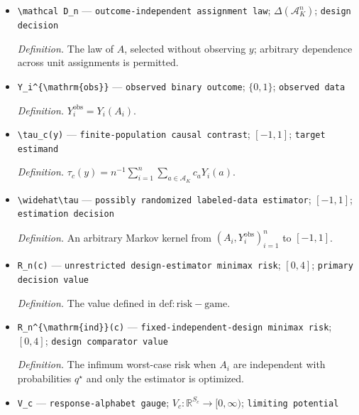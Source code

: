 \documentclass{article}
\begin{document}
\begin{itemize}
  \par\smallskip\noindent\emph{Definition.} \(A=(A_1,\ldots,A_n)\) is the sole source of randomness in the experiment.
  \item \texttt{\textbackslash{}\allowbreak{}mathcal D\_\allowbreak{}n} --- \texttt{outcome-\allowbreak{}independent assignment law}; \(\Delta(\mathcal A_K^n)\); \texttt{design decision}
  \par\smallskip\noindent\emph{Definition.} The law of \(A\), selected without observing \(y\); arbitrary dependence across unit assignments is permitted.
  \item \texttt{Y\_\allowbreak{}i\textasciicircum{}\{\textbackslash{}\allowbreak{}mathrm\{obs\}\allowbreak{}\}\allowbreak{}} --- \texttt{observed binary outcome}; \(\{0,1\}\); \texttt{observed data}
  \par\smallskip\noindent\emph{Definition.} \(Y_i^{\mathrm{obs}}=Y_i(A_i)\).
  \item \texttt{\textbackslash{}\allowbreak{}tau\_\allowbreak{}c(y)} --- \texttt{finite-\allowbreak{}population causal contrast}; \([-1,1]\); \texttt{target estimand}
  \par\smallskip\noindent\emph{Definition.} \(\tau_c(y)=n^{-1}\sum_{i=1}^n\sum_{a\in\mathcal A_K}c_aY_i(a)\).
  \item \texttt{\textbackslash{}\allowbreak{}widehat\textbackslash{}\allowbreak{}tau} --- \texttt{possibly randomized labeled-\allowbreak{}data estimator}; \([-1,1]\); \texttt{estimation decision}
  \par\smallskip\noindent\emph{Definition.} An arbitrary Markov kernel from \((A_i,Y_i^{\mathrm{obs}})_{i=1}^n\) to \([-1,1]\).
  \item \texttt{R\_\allowbreak{}n(c)} --- \texttt{unrestricted design-\allowbreak{}estimator minimax risk}; \([0,4]\); \texttt{primary decision value}
  \par\smallskip\noindent\emph{Definition.} The value defined in \(\mathrm{def:risk-game}\).
  \item \texttt{R\_\allowbreak{}n\textasciicircum{}\{\textbackslash{}\allowbreak{}mathrm\{ind\}\allowbreak{}\}\allowbreak{}(c)} --- \texttt{fixed-\allowbreak{}independent-\allowbreak{}design minimax risk}; \([0,4]\); \texttt{design comparator value}
  \par\smallskip\noindent\emph{Definition.} The infimum worst-case risk when \(A_i\) are independent with probabilities \(q^\star\) and only the estimator is optimized.
  \item \texttt{V\_\allowbreak{}c} --- \texttt{response-\allowbreak{}alphabet gauge}; \(V_c:\mathbb R^{S_c}\to[0,\infty)\); \texttt{limiting potential}

\end{itemize}
\end{document}
